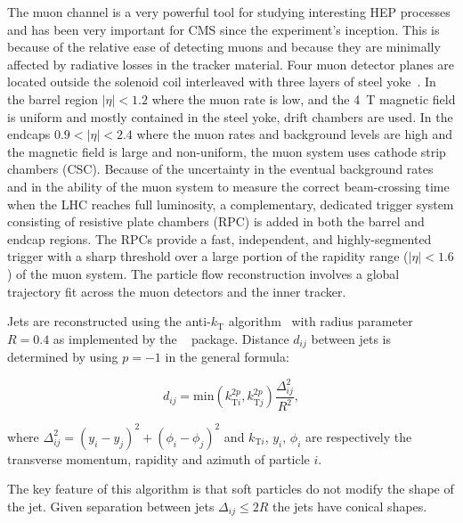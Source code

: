 The muon channel is a very powerful tool for studying interesting HEP processes and has been very important for CMS since the experiment's inception. This is because of the relative ease of detecting muons and because they are minimally affected by radiative losses in the tracker material. Four muon detector planes are located outside the solenoid coil interleaved with three layers of steel yoke~\cite{muon_tech_rep}. In the barrel region $\left|\eta\right|<1.2$ where the muon rate is low, and the 4~T magnetic field is uniform and mostly contained in the steel yoke, drift chambers are used. In the endcaps $0.9<\left|\eta\right|<2.4$ where the muon rates and background levels are high and the magnetic field is large and non-uniform, the muon system uses cathode strip chambers (CSC). Because of the uncertainty in the eventual background rates and in the ability of the muon system to measure the correct beam-crossing time when the LHC reaches full luminosity, a complementary, dedicated trigger system consisting of resistive plate chambers (RPC) is added in both the barrel and endcap regions. The RPCs provide a fast, independent, and highly-segmented trigger with a sharp \pt threshold over a large portion of the rapidity range ($\left|\eta\right|<1.6$) of the muon system. The particle flow reconstruction involves a global trajectory fit across the muon detectors and the inner tracker. 

Jets are reconstructed using the anti-$k_{\text{T}}$ algorithm~\cite{Cacciari:2008gp} with radius parameter $R=0.4$ as implemented by the \FASTJET~\cite{Cacciari:2011ma} package. Distance $d_{ij}$ between jets is determined by using $p=-1$ in the general formula:

\begin{equation}
d_{ij}=\text{min}(k_{\text{T}i}^{2p}, k_{\text{T}j}^{2p})\frac{\Delta_{ij}^{2}}{R^{2}},
\end{equation}

\noindent where $\Delta_{ij}^{2}=(y_{i}-y_{j})^{2}+(\phi_{i}-\phi_{j})^{2}$ and $k_{\text{T}i}$, $y_{i}$, $\phi_{i}$ are respectively the transverse momentum, rapidity and azimuth of particle $i$. 

The key feature of this algorithm is that soft particles do not modify the shape of the jet. Given separation between jets $\Delta_{ij}\leq2R$ the jets have conical shapes. 
